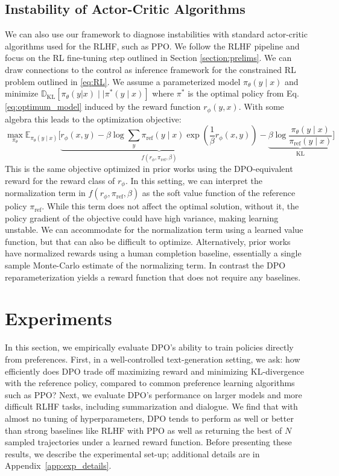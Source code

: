 \documentclass{article}
\newcommand{\piref}{\pi_\text{ref}}
\begin{document}
\subsection{Instability of Actor-Critic Algorithms}
We can also use our framework to diagnose instabilities with standard actor-critic algorithms used for the RLHF, such as PPO. We follow the RLHF pipeline and focus on the RL fine-tuning step outlined in Section \ref{section:prelims}. We can draw connections to the control as inference framework \cite{levine2018reinforcement} for the constrained RL problem outlined in \ref{eq:RL}. We assume a parameterized model $\pi_{\theta}(y\mid x)$ and minimize $\mathbb{D}_{\text{KL}}[\pi_{\theta}(y|x) \mid \mid \pi^*(y\mid x)]$ where $\pi^*$ is the optimal policy from Eq. \ref{eq:optimum_model} induced by the reward function $r_{\phi}(y, x)$. With some algebra this leads to the optimization objective:
\begin{equation}\label{eq:AC}
    \max_{\pi_{\theta}}\mathbb{E}_{\pi_{\theta}(y\mid x)}\bigg[\underbrace{r_{\phi}(x, y) -\beta\log\sum_{y}\piref(y\mid x)\exp\left(\frac{1}{\beta}r_{\phi}(x, y)\right)}_{f(r_{\phi}, \piref, \beta)} - \underbrace{\beta\log\frac{\pi_{\theta}(y\mid x)}{\piref(y\mid x)}}_{\text{KL}}\bigg]
\end{equation}
This is the same objective optimized in prior works 
\citep{ziegler2020finetuning, stiennon2022learning, bai2022training, ouyang2022training} using the DPO-equivalent reward for the reward class of $r_{\phi}$. In this setting, we can interpret the normalization term in $f(r_{\phi}, \piref, \beta)$ as the soft value function of the reference policy $\piref$. While this term does not affect the optimal solution, without it, the policy gradient of the objective could have high variance, making learning unstable. We can accommodate for the normalization term using a learned value function, but that can also be difficult to optimize. Alternatively, prior works have normalized rewards using a human completion baseline, essentially a single sample Monte-Carlo estimate of the normalizing term. In contrast the DPO reparameterization yields a reward function that does not require any baselines. 

\section{Experiments}
In this section, we empirically evaluate DPO's ability to train policies directly from preferences. First, in a well-controlled text-generation setting, we ask: how efficiently does DPO trade off maximizing reward and minimizing KL-divergence with the reference policy, compared to common preference learning algorithms such as PPO? Next, we evaluate DPO's performance on larger models and more difficult RLHF tasks, including summarization and dialogue. We find that with almost no tuning of hyperparameters, DPO tends to perform as well or better than strong baselines like RLHF with PPO as well as returning the best of $N$ sampled trajectories under a learned reward function. Before presenting these results, we describe the experimental set-up; additional details are in Appendix~\ref{app:exp_details}.
\end{document}
